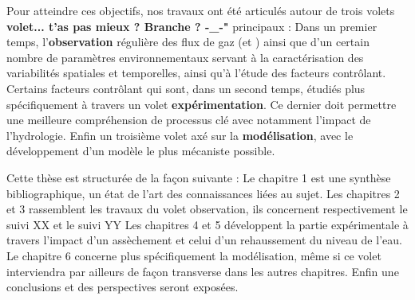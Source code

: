 \begin{linenumbers}
Pour atteindre ces objectifs, nos travaux ont été articulés autour de trois volets \textbf{volet... t'as pas mieux ? Branche ? -\_-"} principaux :
Dans un premier temps, l'\textbf{observation} régulière des flux de gaz (\coo et \chh) ainsi que d'un certain nombre de paramètres environnementaux servant à la caractérisation des variabilités spatiales et temporelles, ainsi qu'à l'étude des facteurs contrôlant.
Certains facteurs contrôlant qui sont, dans un second temps, étudiés plus spécifiquement à travers un volet \textbf{expérimentation}.
Ce dernier doit permettre une meilleure compréhension de processus clé avec notamment l'impact de l'hydrologie.
Enfin un troisième volet axé sur la \textbf{modélisation}, avec le développement d'un modèle le plus mécaniste possible.


Cette thèse est structurée de la façon suivante :
Le chapitre 1 est une synthèse bibliographique, un état de l'art des connaissances liées au sujet.
Les chapitres 2 et 3 rassemblent les travaux du volet observation, ils concernent respectivement le suivi XX et le suivi YY 
Les chapitres 4 et 5 développent la partie expérimentale à travers l'impact d'un assèchement et celui d'un rehaussement du niveau de l'eau.
Le chapitre 6 concerne plus spécifiquement la modélisation, même si ce volet interviendra par ailleurs de façon transverse dans les autres chapitres.
Enfin une conclusions et des perspectives seront exposées.

\end{linenumbers}

%

